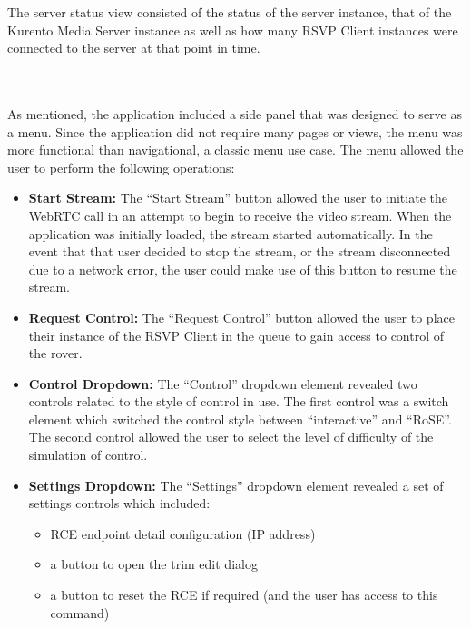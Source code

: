         The server status view consisted of the status of the server instance, that of the Kurento Media Server instance as well as how many RSVP Client instances were connected to the server at that point in time.
        
      \\\\
        As mentioned, the application included a side panel that was designed to serve as a menu. Since the application did not require many pages or views, the menu was more functional than navigational, a classic menu use case. The menu allowed the user to perform the following operations:
        
        \begin{itemize}
          \item \textbf{Start Stream:} The ``Start Stream'' button allowed the user to initiate the WebRTC call in an attempt to begin to receive the video stream. When the application was initially loaded, the stream started automatically. In the event that that user decided to stop the stream, or the stream disconnected due to a network error, the user could make use of this button to resume the stream.
          \item \textbf{Request Control:} The ``Request Control'' button allowed the user to place their instance of the RSVP Client in the queue to gain access to control of the rover.
          \item \textbf{Control Dropdown:} The ``Control'' dropdown element revealed two controls related to the style of control in use. The first control was a switch element which switched the control style between ``interactive'' and ``RoSE''. The second control allowed the user to select the level of difficulty of the simulation of control.
          \item \textbf{Settings Dropdown:} The ``Settings'' dropdown element revealed a set of settings controls which included:
          \begin{itemize}
            \item RCE endpoint detail configuration (IP address)
            \item a button to open the trim edit dialog
            \item a button to reset the RCE if required (and the user has access to this command)
          \end{itemize}
        \end{itemize}
      
    
